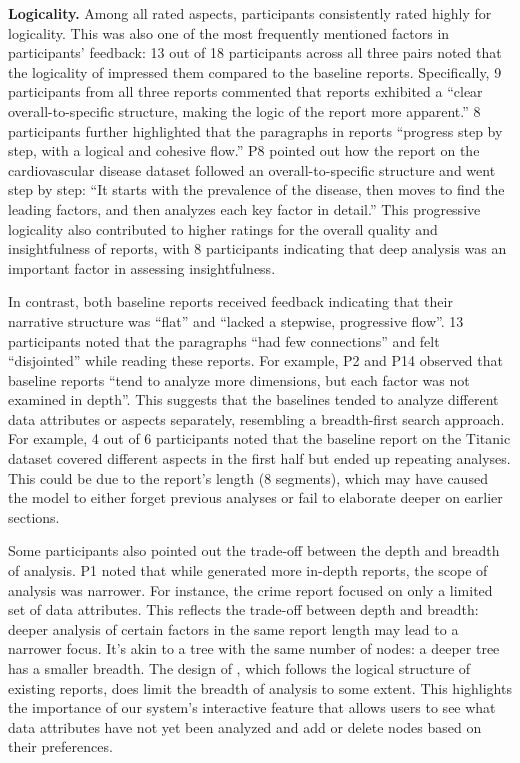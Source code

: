 \textbf{Logicality.}
Among all rated aspects, participants consistently rated \system{} highly for logicality. 
This was also one of the most frequently mentioned factors in participants' feedback: 13 out of 18 participants across all three pairs noted that the logicality of \system{} impressed them compared to the baseline reports. 
Specifically, 9 participants from all three reports commented that \system{} reports exhibited a ``clear overall-to-specific structure, making the logic of the report more apparent.'' 
8 participants further highlighted that the paragraphs in \system{} reports ``progress step by step, with a logical and cohesive flow.'' 
P8 pointed out how the report on the cardiovascular disease dataset followed an overall-to-specific structure and went step by step: ``It starts with the prevalence of the disease, then moves to find the leading factors, and then analyzes each key factor in detail.'' 
This progressive logicality also contributed to higher ratings for the overall quality and insightfulness of \system{} reports, with 8 participants indicating that deep analysis was an important factor in assessing insightfulness.

In contrast, both baseline reports received feedback indicating that their narrative structure was ``flat'' and ``lacked a stepwise, progressive flow''. 
13 participants noted that the paragraphs ``had few connections'' and felt ``disjointed'' while reading these reports. 
For example, P2 and P14 observed that baseline reports ``tend to analyze more dimensions, but each factor was not examined in depth''. 
This suggests that the baselines tended to analyze different data attributes or aspects separately, resembling a breadth-first search approach. 
For example, 4 out of 6 participants noted that the baseline report on the Titanic dataset covered different aspects in the first half but ended up repeating analyses. 
This could be due to the report's length (8 segments), which may have caused the model to either forget previous analyses or fail to elaborate deeper on earlier sections.

Some participants also pointed out the trade-off between the depth and breadth of analysis. 
P1 noted that while \system{} generated more in-depth reports, the scope of analysis was narrower. 
For instance, the crime report focused on only a limited set of data attributes. 
This reflects the trade-off between depth and breadth: deeper analysis of certain factors in the same report length may lead to a narrower focus. 
It's akin to a tree with the same number of nodes: a deeper tree has a smaller breadth. 
The design of \system{}, which follows the logical structure of existing reports, does limit the breadth of analysis to some extent. 
This highlights the importance of our system's interactive feature that allows users to see what data attributes have not yet been analyzed and add or delete nodes based on their preferences. 

